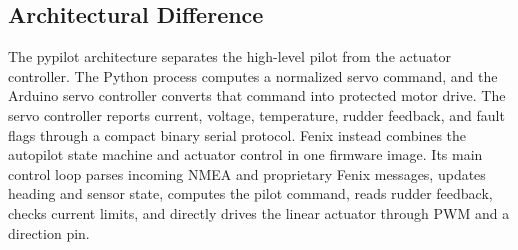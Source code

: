\documentclass[10pt,twocolumn]{article}
\begin{document}
\subsection{Architectural Difference}
The pypilot architecture separates the high-level pilot from the actuator
controller.  The Python process computes a normalized servo command, and
the Arduino servo controller converts that command into protected motor
drive.  The servo controller reports current, voltage, temperature, rudder
feedback, and fault flags through a compact binary serial protocol.
Fenix instead combines the autopilot state machine and actuator control in
one firmware image.  Its main control loop parses incoming NMEA and
proprietary Fenix messages, updates heading and sensor state, computes the
pilot command, reads rudder feedback, checks current limits, and directly
drives the linear actuator through PWM and a direction pin.
\end{document}
